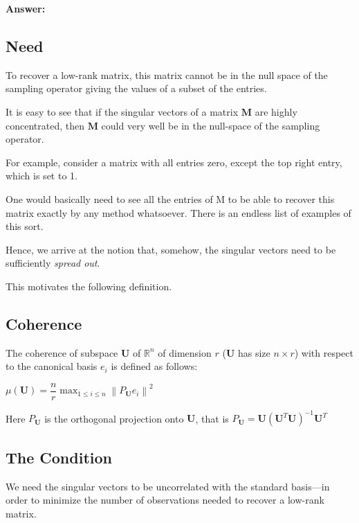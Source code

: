 \documentclass[fleqn, 11pt]{article}
\newcommand{\bs}[1]{\boldsymbol{#1}}
\newcommand\norm[1]{\left\lVert#1\right\rVert}
\begin{document}
\hrulefill

\medskip

\textbf{Answer: }

\subsection*{Need}
    
To recover a low-rank matrix,
this matrix cannot be in the null space of the sampling operator giving the values of a subset of the
entries.

\smallskip

It is easy to see that if the singular vectors of a matrix $\bs{M}$ are highly concentrated,
then $\bs{M}$ could very well be in the null-space of the sampling operator.

\smallskip

For example, consider a matrix with all entries zero, except the top right entry, which is set to 1.

One would basically need to see all the entries of M to be able to recover this
matrix exactly by any method whatsoever. There is an endless list of examples of this sort.

\smallskip

Hence,
we arrive at the notion that, somehow, the singular vectors need to be sufficiently \textit{spread out}.

\smallskip

This motivates the following definition.
    
\subsection*{Coherence }

The coherence of subspace $\bs{U}$ of  $\mathbb{R}^n$ of
dimension $r$ ($\bs{U}$ has size
$n \times r$) with respect to the canonical
basis $e_i$ is defined as follows:
\begin{center}
    $\mu(\bs{U})=\dfrac{n}{r} \max_{1 \leq i \leq n} \norm{P_{\bs{U}} e_i}^2$
\end{center}

Here $P_{\bs{U}}$  is the orthogonal projection onto $\bs{U}$, 
that is $P_{\bs{U}}=\bs{U} (\bs{U}^T\bs{U})^{-1} \bs{U}^T $


\subsection*{The Condition}

We need the singular vectors to be uncorrelated with the standard basis—in order to minimize the number of observations needed to
recover a low-rank matrix.
\end{document}
